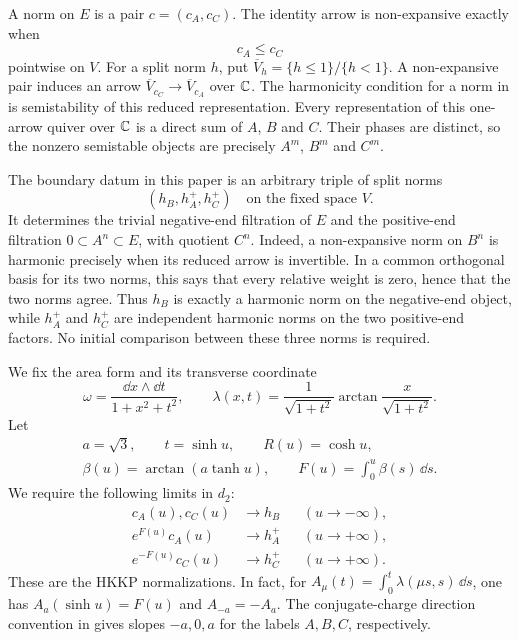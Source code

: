A norm on $E$ is a pair $c=(c_A,c_C)$. The identity arrow is non-expansive
exactly when
\begin{equation}\label{eq:order}
 c_A\le c_C
\end{equation}
pointwise on $V$. For a split norm $h$, put
$\overline V_h=\{h\le1\}/\{h<1\}$. A non-expansive pair induces an
arrow $\overline V_{c_C}\to\overline V_{c_A}$ over $\mathbb C$.
The harmonicity condition for a norm in \cite[Definition~7.3]{HKKP26}
is semistability of this reduced representation. Every representation
of this one-arrow quiver over $\mathbb C$ is a direct sum of $A$, $B$ and $C$.
Their phases are distinct, so the nonzero semistable objects are precisely
$A^m$, $B^m$ and $C^m$.

The boundary datum in this paper is an arbitrary triple of split norms
\begin{equation}\label{eq:boundarytriple}
 (h_B,h_A^+,h_C^+)\quad\text{on the fixed space }V.
\end{equation}
It determines the trivial negative-end filtration of $E$ and the
positive-end filtration $0\subset A^n\subset E$, with quotient $C^n$.
Indeed, a non-expansive norm on $B^n$ is harmonic precisely when its
reduced arrow is invertible. In a common orthogonal basis for its two
norms, this says that every relative weight is zero, hence that the two
norms agree. Thus $h_B$ is exactly a harmonic norm on the negative-end
object, while $h_A^+$ and $h_C^+$ are independent harmonic norms on the
two positive-end factors. No initial comparison between these three
norms is required.

We fix the area form and its transverse coordinate
\begin{equation}\label{eq:area}
 \omega=\frac{\dd x\wedge\dd t}{1+x^2+t^2},\qquad
 \lambda(x,t)=\frac{1}{\sqrt{1+t^2}}
                  \arctan\frac{x}{\sqrt{1+t^2}}.
\end{equation}
Let
\begin{equation}\label{eq:utime}
 \begin{gathered}
 a=\sqrt3,\qquad t=\sinh u,\qquad R(u)=\cosh u,\\
 \beta(u)=\arctan(a\tanh u),\qquad F(u)=\int_0^u\beta(s)\,\dd s.
 \end{gathered}
\end{equation}
We require the following limits in $d_2$:
\begin{equation}\label{eq:normalizedends}
 \begin{aligned}
 c_A(u),c_C(u)&\longrightarrow h_B &&(u\longrightarrow-\infty),\\
 e^{F(u)}c_A(u)&\longrightarrow h_A^+ &&(u\longrightarrow+\infty),\\
 e^{-F(u)}c_C(u)&\longrightarrow h_C^+ &&(u\longrightarrow+\infty).
 \end{aligned}
\end{equation}
These are the HKKP normalizations. In fact, for
$A_\mu(t)=\int_0^t\lambda(\mu s,s)\,\dd s$, one has
$A_a(\sinh u)=F(u)$ and $A_{-a}=-A_a$. The conjugate-charge direction
convention in \cite[Definition~7.8]{HKKP26} gives slopes $-a,0,a$
for the labels $A,B,C$, respectively.

